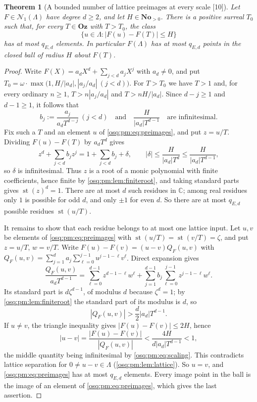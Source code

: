 \documentclass[11pt,letterpaper]{article}
\numberwithin{equation}{section}
\newtheorem{theorem}{Theorem}[section]
\theoremstyle{definition}
\theoremstyle{remark}
\theoremstyle{plain}
\newcommand{\No}{\mathbf{No}}
\newcommand{\Oz}{\mathbf{Oz}}
\newcommand{\C}{\mathbb C}
\newcommand{\st}{\operatorname{st}}
\newcommand{\Num}{\mathscr N}
\newcommand{\src}[1]{\textup{\textsf{[#1]}}}
\begin{document}
\begin{theorem}[A bounded number of lattice preimages at every scale \src{10}]
\label{osq:pm:thm:localcount}
Let $F\in\Num_1(\Lambda)$ have degree $d\ge2$, and let $H\in\No_{>0}$. There is a positive
surreal $T_0$ such that, for every $T\in\Oz$ with $T>T_0$, the class
\begin{equation}\label{osq:pm:eq:preimages}
 \{u\in\Lambda:|F(u)-F(T)|\le H\}
\end{equation}
has at most $q_{E,d}$ elements. In particular $F(\Lambda)$ has at most $q_{E,d}$ points in
the closed ball of radius $H$ about $F(T)$.
\end{theorem}
\begin{proof}
Write $F(X)=a_dX^d+\sum_{j<d}a_jX^j$ with $a_d\ne0$, and put
$T_0=\omega\cdot\max\bigl(1,H/|a_d|,|a_j/a_d|\ (j<d)\bigr)$. For $T>T_0$ we have $T>1$
and, for every ordinary $n\ge1$, $T>n|a_j/a_d|$ and $T>nH/|a_d|$. Since $d-j\ge1$ and
$d-1\ge1$, it follows that
\begin{equation}\label{osq:pm:eq:scaling}
 b_j:=\frac{a_j}{a_dT^{d-j}}\ (j<d)\quad\text{and}\quad\frac{H}{|a_d|T^{d-1}}
 \quad\text{are infinitesimal.}
\end{equation}
Fix such a $T$ and an element $u$ of \eqref{osq:pm:eq:preimages}, and put $z=u/T$. Dividing
$F(u)-F(T)$ by $a_dT^d$ gives
\begin{equation}\label{osq:pm:eq:normalizedroot}
 z^d+\sum_{j<d}b_jz^j=1+\sum_{j<d}b_j+\delta,\qquad
 |\delta|\le\frac{H}{|a_d|T^d}\le\frac{H}{|a_d|T^{d-1}},
\end{equation}
so $\delta$ is infinitesimal. Thus $z$ is a root of a monic polynomial with finite
coefficients, hence finite by \cref{osq:pm:lem:finiteroot}, and taking standard parts
gives $\st(z)^d=1$. There are at most $d$ such residues in $\C$; among real residues only
$1$ is possible for odd $d$, and only $\pm1$ for even $d$. So there are at most $q_{E,d}$
possible residues $\st(u/T)$.

It remains to show that each residue belongs to at most one lattice input. Let $u,v$ be
elements of \eqref{osq:pm:eq:preimages} with $\st(u/T)=\st(v/T)=\zeta$, and put $z=u/T$,
$w=v/T$. Write $F(u)-F(v)=(u-v)Q_F(u,v)$ with
$Q_F(u,v)=\sum_{j=1}^da_j\sum_{\ell=0}^{j-1}u^{j-1-\ell}v^\ell$. Direct expansion gives
\begin{equation}\label{osq:pm:eq:normalizeddifference}
 \frac{Q_F(u,v)}{a_dT^{d-1}}
 =\sum_{\ell=0}^{d-1}z^{d-1-\ell}w^\ell
 +\sum_{j=1}^{d-1}b_j\sum_{\ell=0}^{j-1}z^{j-1-\ell}w^\ell .
\end{equation}
Its standard part is $d\zeta^{d-1}$, of modulus $d$ because $\zeta^d=1$; by
\cref{osq:pm:lem:finiteroot} the standard part of its modulus is $d$, so
\[
 |Q_F(u,v)|>\frac d2|a_d|T^{d-1}.
\]
If $u\ne v$, the triangle inequality gives $|F(u)-F(v)|\le2H$, hence
\[
 |u-v|=\frac{|F(u)-F(v)|}{|Q_F(u,v)|}<\frac{4H}{d|a_d|T^{d-1}}<1,
\]
the middle quantity being infinitesimal by \eqref{osq:pm:eq:scaling}. This contradicts
lattice separation for $0\ne u-v\in\Lambda$ (\cref{osq:pm:lem:lattice}). So $u=v$, and
\eqref{osq:pm:eq:preimages} has at most $q_{E,d}$ elements. Every image point in the ball
is the image of an element of \eqref{osq:pm:eq:preimages}, which gives the last assertion.
\end{proof}
\end{document}
